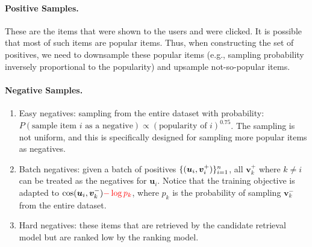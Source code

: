         \paragraph{Positive Samples.}
            These are the items that were shown to the users and were clicked.
            It is possible that most of such items are popular items. 
            Thus, when constructing the set of positives, we need to downsample these popular items (e.g., sampling probability inversely proportional to the popularity) and upsample not-so-popular items. 

        \paragraph{Negative Samples.}
                \begin{enumerate}
                    \item Easy negatives: sampling  from the entire dataset with probability: $P(\text{sample item $i$ as a negative}) \propto (\text{popularity of $i$})^{0.75}$. The sampling is not uniform, and this is specifically designed for sampling more popular items as negatives. 
                    
                    \item Batch negatives: given a batch of positives $\{ (\bm{u}_i, \bm{v}_i^+) \}_{i=1}^n$, all $\bm{v}_k^+$ where $k \ne i$ can be treated as the negatives for $\bm{u}_i$. 
                    Notice that the training objective is adapted to $\text{cos}(\bm{u}_i, \bm{v}_k^-) \textcolor{red}{- \log p_k}$, where $p_k$ is the probability of sampling $\bm{v}_k^-$ from the entire dataset.
                    \item Hard negatives: these items that are retrieved by the candidate retrieval model but are ranked low by the ranking model. 
                \end{enumerate}
    
